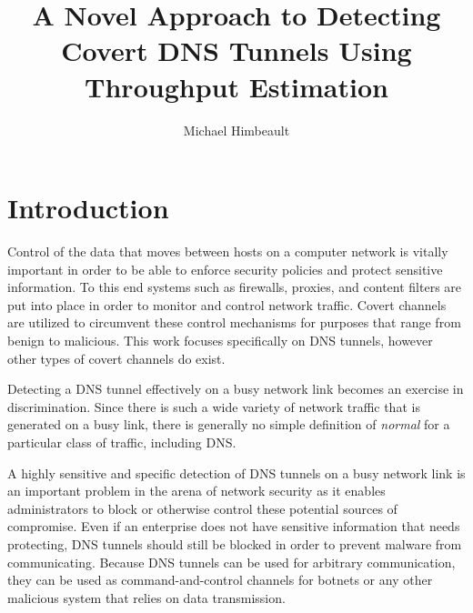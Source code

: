 \documentclass{llncs}
\begin{document}

\title{A Novel Approach to Detecting Covert DNS Tunnels Using Throughput Estimation}
\author{Michael Himbeault}
\maketitle


\smallskip
{}

\section{Introduction}
Control of the data that moves between hosts on a computer network is vitally
important in order to be able to enforce security policies and protect sensitive
information. To this end systems such as firewalls, proxies, and content filters
are put into place in order to monitor and control network traffic. Covert
channels are utilized to circumvent these control mechanisms for purposes that
range from benign\cite{sans-dnshash} to malicious. This work focuses
specifically on DNS tunnels, however other types of covert channels do exist.

Detecting a DNS tunnel effectively on a busy network link becomes an exercise in
discrimination. Since there is such a wide variety of network traffic that is
generated on a busy link, there is generally no simple definition of
\emph{normal} for a particular class of traffic, including DNS.

A highly sensitive and specific detection of DNS tunnels on a busy network link
is an important problem in the arena of network security as it enables
administrators to block or otherwise control these potential sources of
compromise. Even if an enterprise does not have sensitive information
that needs protecting, DNS tunnels should still be blocked in order to prevent
malware from communicating\cite{Dietrich2011}. Because DNS tunnels can be used
for arbitrary communication, they can be used as command-and-control channels
for botnets or any other malicious system that relies
on data transmission.
\end{document}
